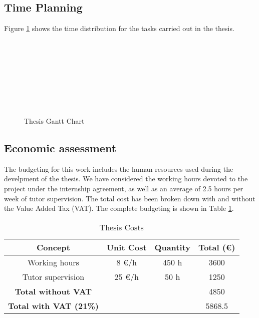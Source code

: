 \documentclass[a4paper,11pt, titlepage, twoside]{article}
\begin{document}
\subsection{Time Planning}

Figure \ref{fig:gantt} shows the time distribution for the tasks carried out in the thesis.
\begin{figure}[h]
\begin{center}
\begin{ganttchart}{1}{20}
     \\
         \\
     \\
     \\
     \\
     \\
     \\
\end{ganttchart}
\caption{Thesis Gantt Chart}
\label{fig:gantt}
\end{center}
\end{figure}

\subsection{Economic assessment}

The budgeting for this work includes the human resources used during the develpment of the thesis. We have considered the working hours devoted to the project under the internship agreement, as well as an average of 2.5 hours per week of tutor supervision.
The total cost has been broken down with and without the Value Added Tax (VAT). The complete budgeting is shown in Table 
\ref{tab:costs}.
\begin{table}[h]
\centering
\begin{tabular}{c c c c}
\hline
\textbf{Concept} & \textbf{ Unit Cost} & \textbf{Quantity} & \textbf{ Total (\euro)} \\
\hline
Working hours & 8 \euro/h  & 450 h & 3600 \\
Tutor supervision & 25 \euro/h   &  50 h & 1250 \\
\hline
\textbf{Total without VAT} & & & 4850 \\
\hline
\textbf{Total with VAT (21\%)} & & &  5868.5 \\
\hline
\end{tabular}
\caption{Thesis Costs}
\label{tab:costs}
\end{table}
\end{document}
